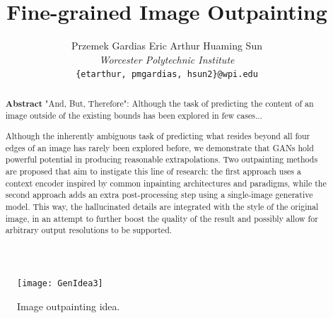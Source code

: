 \documentclass[twocolumn,showpacs,%
  nofootinbib,aps,superscriptaddress,%
  eqsecnum,prd,notitlepage,showkeys,10pt]{revtex4-1}
\begin{document}
\renewcommand{\topfraction}{.85}
\renewcommand{\bottomfraction}{.7}
\renewcommand{\textfraction}{.15}
\renewcommand{\floatpagefraction}{.66}
\renewcommand{\dbltopfraction}{.66}
\renewcommand{\dblfloatpagefraction}{.66}
\setcounter{topnumber}{9}
\setcounter{bottomnumber}{9}
\setcounter{totalnumber}{20}
\setcounter{dbltopnumber}{9}

\title{Fine-grained Image Outpainting}
\author{Przemek Gardias \qquad
Eric Arthur \qquad
Huaming Sun \\ [0.1cm]
\textit{Worcester Polytechnic Institute} \\ [0.05cm]
\texttt{\{etarthur, pmgardias, hsun2\}@wpi.edu} \\ [0.05cm]
}

\begin{abstract}
\textbf{Abstract} \hspace{0.3cm}
"And, But, Therefore":
Although the task of predicting the content of an image outside of the existing bounds has been explored in few cases...


Although the inherently ambiguous task of predicting what resides beyond all four edges of an image has rarely been explored before, we demonstrate that GANs hold powerful potential in producing reasonable extrapolations. Two outpainting methods are proposed that aim to instigate this line of research: the first approach uses a context encoder inspired by common inpainting architectures and paradigms, while the second approach adds an extra post-processing step using a single-image generative model. This way, the hallucinated details are integrated with the style of the original image, in an attempt to further boost the quality of the result and possibly allow for arbitrary output resolutions to be supported.
\end{abstract}

\maketitle

\begin{figure}[tp]
\centering
  \begin{adjustbox}{center}
  \texttt{[image: GenIdea3]}
  \end{adjustbox}
  \caption{Image outpainting idea.}
  \label{fig:GenIdea}
\end{figure}
\end{document}
